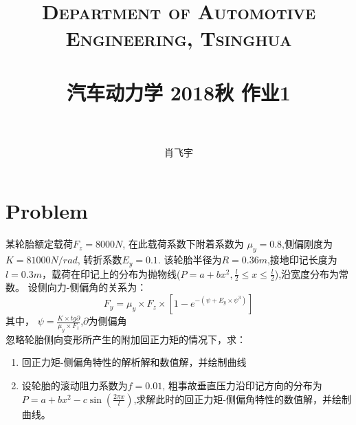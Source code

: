 \documentclass[paper=a4, fontsize=11pt]{scrartcl} %
\title{	
\normalfont \normalsize 
\textsc{Department of Automotive Engineering, Tsinghua} \\ [25pt] %
\horrule{0.5pt} \\[0.4cm] %
\huge 汽车动力学 \quad 2018秋 \quad 作业1 \\ %
\horrule{2pt} \\[0.5cm] %
}
\author{肖飞宇\quad 2018210441} %
\date{} %
\numberwithin{equation}{section} %
\numberwithin{figure}{section} %
\numberwithin{table}{section} %
\begin{document}
\maketitle %

\section{Problem}
某轮胎额定载荷$F_z = 8000N$, 在此载荷系数下附着系数为 $\mu_y = 0.8$,侧偏刚度为$K = 81000 N/rad$, 转折系数$E_y = 0.1$. 该轮胎半径为$R=0.36m$,接地印记长度为$l = 0.3m$，载荷在印记上的分布为抛物线($P = a+bx^2, \frac{l}{2} \leq x \leq \frac{l}{2}$),沿宽度分布为常数。 设侧向力-侧偏角的关系为：
\begin{equation*}
F_y = \mu_y \times F_z \times \left[1-e^{-(\psi + E_y \times \psi^3)}\right]
\end{equation*}
其中， $\psi = \frac{K \times tg{\partial}}{\mu_y \times F_z}$,\quad $\partial$为侧偏角\\
忽略轮胎侧向变形所产生的附加回正力矩的情况下，求：
\begin{enumerate}
  \item 回正力矩-侧偏角特性的解析解和数值解，并绘制曲线
  \item 设轮胎的滚动阻力系数为$f = 0.01$, 粗事故垂直压力沿印记方向的分布为 $P = a+bx^2 -c\sin(\frac{2 \pi x}{l})$,求解此时的回正力矩-侧偏角特性的数值解，并绘制曲线。
\end{enumerate}
\end{document}
